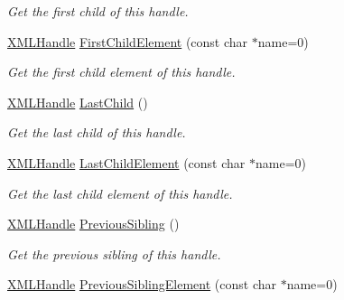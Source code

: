 \begin{DoxyCompactItemize}
\begin{DoxyCompactList}\small\item\em Get the first child of this handle. \end{DoxyCompactList}\item 
\hyperlink{classtinyxml2_1_1XMLHandle}{X\+M\+L\+Handle} \hyperlink{classtinyxml2_1_1XMLHandle_a74b04dd0f15e0bf01860e282b840b6a3}{First\+Child\+Element} (const char $\ast$name=0)\hypertarget{classtinyxml2_1_1XMLHandle_a74b04dd0f15e0bf01860e282b840b6a3}{}\label{classtinyxml2_1_1XMLHandle_a74b04dd0f15e0bf01860e282b840b6a3}

\begin{DoxyCompactList}\small\item\em Get the first child element of this handle. \end{DoxyCompactList}\item 
\hyperlink{classtinyxml2_1_1XMLHandle}{X\+M\+L\+Handle} \hyperlink{classtinyxml2_1_1XMLHandle_a9d09f04435f0f2f7d0816b0198d0517b}{Last\+Child} ()\hypertarget{classtinyxml2_1_1XMLHandle_a9d09f04435f0f2f7d0816b0198d0517b}{}\label{classtinyxml2_1_1XMLHandle_a9d09f04435f0f2f7d0816b0198d0517b}

\begin{DoxyCompactList}\small\item\em Get the last child of this handle. \end{DoxyCompactList}\item 
\hyperlink{classtinyxml2_1_1XMLHandle}{X\+M\+L\+Handle} \hyperlink{classtinyxml2_1_1XMLHandle_a42cccd0ce8b1ce704f431025e9f19e0c}{Last\+Child\+Element} (const char $\ast$name=0)\hypertarget{classtinyxml2_1_1XMLHandle_a42cccd0ce8b1ce704f431025e9f19e0c}{}\label{classtinyxml2_1_1XMLHandle_a42cccd0ce8b1ce704f431025e9f19e0c}

\begin{DoxyCompactList}\small\item\em Get the last child element of this handle. \end{DoxyCompactList}\item 
\hyperlink{classtinyxml2_1_1XMLHandle}{X\+M\+L\+Handle} \hyperlink{classtinyxml2_1_1XMLHandle_a428374e756f4db4cbc287fec64eae02c}{Previous\+Sibling} ()\hypertarget{classtinyxml2_1_1XMLHandle_a428374e756f4db4cbc287fec64eae02c}{}\label{classtinyxml2_1_1XMLHandle_a428374e756f4db4cbc287fec64eae02c}

\begin{DoxyCompactList}\small\item\em Get the previous sibling of this handle. \end{DoxyCompactList}\item 
\hyperlink{classtinyxml2_1_1XMLHandle}{X\+M\+L\+Handle} \hyperlink{classtinyxml2_1_1XMLHandle_a786957e498039554ed334cdc36612a7e}{Previous\+Sibling\+Element} (const char $\ast$name=0)\hypertarget{classtinyxml2_1_1XMLHandle_a786957e498039554ed334cdc36612a7e}{}\label{classtinyxml2_1_1XMLHandle_a786957e498039554ed334cdc36612a7e}


\end{DoxyCompactItemize}
